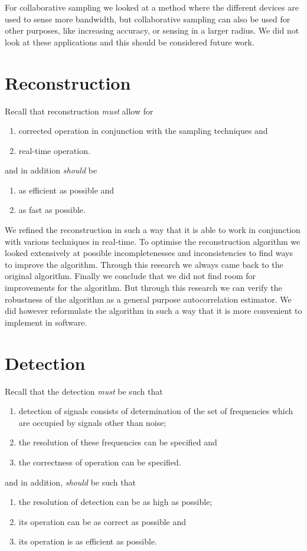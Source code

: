 \documentclass[a4paper, openany, oneside]{memoir}
\begin{document}
For collaborative sampling we looked at a method where the different devices are used to sense more bandwidth, but collaborative sampling can also be used for other purposes, like increasing accuracy, or sensing in a larger radius. We did not look at these applications and this should be considered future work.

\section{Reconstruction}
Recall that reconstruction \emph{must} allow for
\begin{enumerate}
    \item corrected operation in conjunction with the sampling techniques and
    \item real-time operation.
\end{enumerate}
and in addition \emph{should} be
\begin{enumerate}
    \item as efficient as possible and
    \item as fast as possible.
\end{enumerate}

We refined the reconstruction in such a way that it is able to work in conjunction with various techniques in real-time. To optimise the reconstruction algorithm we looked extensively at possible incompletenesses and inconsistencies to find ways to improve the algorithm. Through this research we always came back to the original algorithm. Finally we conclude that we did not find room for improvements for the algorithm. But through this research we can verify the robustness of the algorithm as a general purpose autocorrelation estimator. We did however reformulate the algorithm in such a way that it is more convenient to implement in software.

\section{Detection}
Recall that the detection \emph{must} be such that
\begin{enumerate}
    \item detection of signals consists of determination of the set of frequencies which are occupied by signals other than noise;
    \item the resolution of these frequencies can be specified and
    \item the correctness of operation can be specified.
\end{enumerate}
and in addition, \emph{should} be such that
\begin{enumerate}
    \item the resolution of detection can be as high as possible;
    \item its operation can be as correct as possible and
    \item its operation is as efficient as possible.
\end{enumerate}
\end{document}
